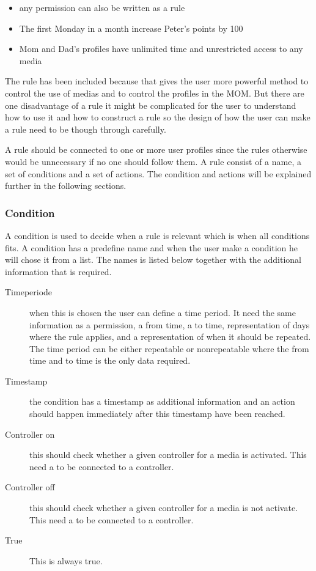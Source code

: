 \begin{itemize}
	\item any permission can also be written as a rule
	\item The first Monday in a month increase Peter's points by 100
	\item Mom and Dad's profiles have unlimited time and unrestricted access to any media
\end{itemize}

The rule has been included because that gives the user more powerful method to control the use of medias and to control the profiles in the MOM.
But there are one disadvantage of a rule it might be complicated for the user to understand how to use it and how to construct a rule so the design of how the user can make a rule need to be though through carefully.

A rule should be connected to one or more user profiles since the rules otherwise would be unnecessary if no one should follow them. A rule consist of a name, a set of conditions and a set of actions. The condition and actions will be explained further in the following sections.
	
\subsubsection{Condition}
A condition is used to decide when a rule is relevant which is when all conditions fits. A condition has a predefine name and when the user make a condition he will chose it from a list. The names is listed below together with the additional information that is required. 

\begin{description}
	\item[Timeperiode] when this is chosen the user can define a time period. It need the same information as a permission, a from time, a to time, representation of days where the rule applies, and a representation of when it should be repeated. The time period can be either repeatable or nonrepeatable where the from time and to time is the only data required.
	\item[Timestamp] the condition has a timestamp as additional information and an action should happen immediately after this timestamp have been reached. 
	\item[Controller on] this should check whether a given controller for a media is activated. This need a to be connected to a controller.
	\item[Controller off] this should check whether a given controller for a media is not activate. This need a to be connected to a controller.
	\item[True] This is always true.
\end{description}

